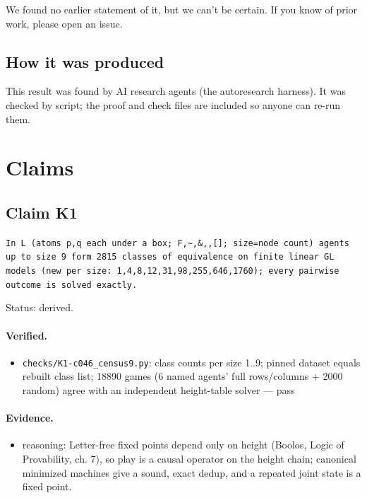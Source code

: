 \documentclass{article}
\begin{document}
We found no earlier statement of it, but we can't be certain. If you know of prior work, please open an issue.

\subsection*{How it was produced}

This result was found by AI research agents (the autoresearch harness). It was checked by script; the proof and check files are included so anyone can re-run them.

\section{Claims}

\subsection*{Claim K1}

\texttt{In L (atoms p,q each under a box; F,\textasciitilde{},\&,\textbar{},[]; size=node count) agents up to size 9 form 2815 classes of equivalence on finite linear GL models (new per size: 1,4,8,12,31,98,255,646,1760); every pairwise outcome is solved exactly.}

Status: derived.

\paragraph{Verified.}
\begin{itemize}
\item \texttt{checks/K1-c046\_census9.py}: class counts per size 1..9; pinned dataset equals rebuilt class list; 18890 games (6 named agents' full rows/columns + 2000 random) agree with an independent height-table solver --- pass
\end{itemize}

\paragraph{Evidence.}
\begin{itemize}
\item reasoning: Letter-free fixed points depend only on height (Boolos, Logic of Provability, ch. 7), so play is a causal operator on the height chain; canonical minimized machines give a sound, exact dedup, and a repeated joint state is a fixed point.
\end{itemize}
\end{document}
